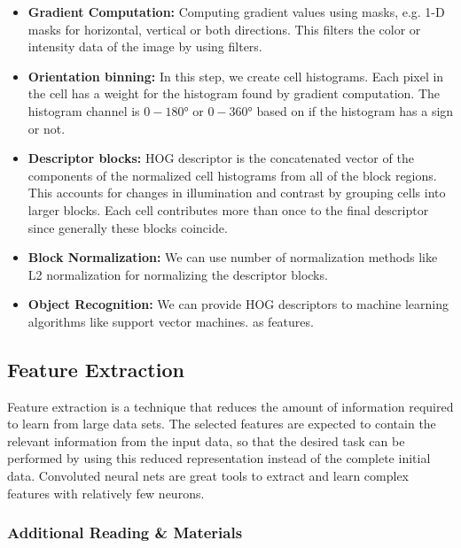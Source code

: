 \documentclass[twoside]{article}
\begin{document}
\begin{itemize}
\item \textbf{Gradient Computation:}
Computing gradient values using masks, e.g. 1-D masks for horizontal, vertical or both directions. This filters the color or intensity data of the image by using filters.

\item \textbf{Orientation binning:}
In this step, we create cell histograms. Each pixel in the cell has a weight for the histogram found by gradient computation. The histogram channel is $0-\ang{180} $ or $0-\ang{360}$  based on if the histogram has a sign or not.

\item \textbf{Descriptor blocks:}
HOG descriptor is the concatenated vector of the components of the normalized cell histograms from all of the block regions. This accounts for changes in illumination and contrast by grouping cells into larger blocks. Each cell contributes more than once to the final descriptor since generally these blocks coincide.

\item \textbf{Block Normalization:}
We can use number of normalization methods like L2 normalization for normalizing the descriptor blocks.

\item \textbf{Object Recognition:}
We can provide HOG descriptors to machine learning algorithms like support vector machines. as features.

\end{itemize}


\subsection{Feature Extraction}
Feature extraction is a technique that reduces the amount of information required to learn from large data sets. The selected features are expected to contain the relevant information from the input data, so that the desired task can be performed by using this reduced representation instead of the complete initial data. Convoluted neural nets are great tools to extract and learn complex features with relatively few neurons.




\subsubsection*{Additional Reading \& Materials}
\end{document}
